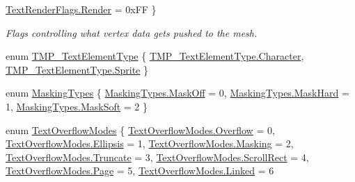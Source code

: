 \begin{DoxyCompactItemize}
\mbox{\hyperlink{namespace_t_m_pro_ac5a571bdd8e4873a73f2c05b62feff0ea5e520da5341f2fec6d3bbfe7ef357922}{Text\+Render\+Flags.\+Render}} = 0x\+FF
 \}
\begin{DoxyCompactList}\small\item\em Flags controlling what vertex data gets pushed to the mesh. \end{DoxyCompactList}\item 
enum \mbox{\hyperlink{namespace_t_m_pro_ab5662f47179bf1b81c575ecf80b24065}{T\+M\+P\+\_\+\+Text\+Element\+Type}} \{ \mbox{\hyperlink{namespace_t_m_pro_ab5662f47179bf1b81c575ecf80b24065a76a40e4f974fd895a0a2598c1cee28b4}{T\+M\+P\+\_\+\+Text\+Element\+Type.\+Character}}, 
\mbox{\hyperlink{namespace_t_m_pro_ab5662f47179bf1b81c575ecf80b24065a51f2b7b14433aa22c67d1f4fc18943cd}{T\+M\+P\+\_\+\+Text\+Element\+Type.\+Sprite}}
 \}
\item 
enum \mbox{\hyperlink{namespace_t_m_pro_adca59e3caf7e75b8dfdcac4f70a31987}{Masking\+Types}} \{ \mbox{\hyperlink{namespace_t_m_pro_adca59e3caf7e75b8dfdcac4f70a31987a0de49bd0390bff98b72299a16b0d6881}{Masking\+Types.\+Mask\+Off}} = 0, 
\mbox{\hyperlink{namespace_t_m_pro_adca59e3caf7e75b8dfdcac4f70a31987abc9442f15c82217bbd92e69f48f5f5fa}{Masking\+Types.\+Mask\+Hard}} = 1, 
\mbox{\hyperlink{namespace_t_m_pro_adca59e3caf7e75b8dfdcac4f70a31987a9edf22d3bef1670c137143e2c3c4e01d}{Masking\+Types.\+Mask\+Soft}} = 2
 \}
\item 
enum \mbox{\hyperlink{namespace_t_m_pro_a7234b7b8868aa9f0174e7db46e272a17}{Text\+Overflow\+Modes}} \{ \newline
\mbox{\hyperlink{namespace_t_m_pro_a7234b7b8868aa9f0174e7db46e272a17a129e8109f319870e328cc7a1d5b5cae3}{Text\+Overflow\+Modes.\+Overflow}} = 0, 
\mbox{\hyperlink{namespace_t_m_pro_a7234b7b8868aa9f0174e7db46e272a17a8a97ba435dcdb6750b240cdce3ff3e11}{Text\+Overflow\+Modes.\+Ellipsis}} = 1, 
\mbox{\hyperlink{namespace_t_m_pro_a7234b7b8868aa9f0174e7db46e272a17a2a776f2569edf87c0c8d068a1067668c}{Text\+Overflow\+Modes.\+Masking}} = 2, 
\mbox{\hyperlink{namespace_t_m_pro_a7234b7b8868aa9f0174e7db46e272a17aa8156810bfee2bd2b44765b9e91db3bd}{Text\+Overflow\+Modes.\+Truncate}} = 3, 
\newline
\mbox{\hyperlink{namespace_t_m_pro_a7234b7b8868aa9f0174e7db46e272a17adfa6849604e0a596c2ab9acaa096b239}{Text\+Overflow\+Modes.\+Scroll\+Rect}} = 4, 
\mbox{\hyperlink{namespace_t_m_pro_a7234b7b8868aa9f0174e7db46e272a17a193cfc9be3b995831c6af2fea6650e60}{Text\+Overflow\+Modes.\+Page}} = 5, 
\mbox{\hyperlink{namespace_t_m_pro_a7234b7b8868aa9f0174e7db46e272a17abec6fc2cd3711e7e2290d1653216add6}{Text\+Overflow\+Modes.\+Linked}} = 6

\end{DoxyCompactItemize}
